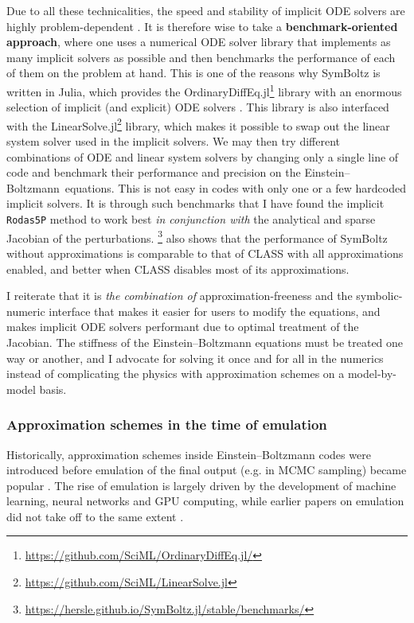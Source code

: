 \documentclass[USenglish, thumbmarks]{uiophdthesis} %
\newcommand\EB{Einstein--Boltzmann}
\begin{document}
Due to all these technicalities,
the speed and stability of implicit ODE solvers are highly problem-dependent
\cite[e.g.][section IV.10]{hairerSolvingOrdinaryDifferential1996}.
It is therefore wise to take a \textbf{benchmark-oriented approach},
where one uses a numerical ODE solver library that implements as many implicit solvers as possible
and then benchmarks the performance of each of them on the problem at hand.
This is one of the reasons why SymBoltz is written in Julia,
which provides the OrdinaryDiffEq.jl\footnote{\url{https://github.com/SciML/OrdinaryDiffEq.jl/}} library
with an enormous selection of implicit (and explicit) ODE solvers
\cite{rackauckasDifferentialEquationsjlPerformantFeatureRich2017a}.
This library is also interfaced with the LinearSolve.jl\footnote{\url{https://github.com/SciML/LinearSolve.jl}} library,
which makes it possible to swap out the linear system solver used in the implicit solvers.
We may then try different combinations of ODE and linear system solvers
by changing only a single line of code and benchmark their performance and precision on the \EB{} equations.
This is not easy in codes with only one or a few hardcoded implicit solvers.
It is through such benchmarks that I have found the implicit \texttt{Rodas5P} method to work best
\emph{in conjunction with} the analytical and sparse Jacobian of the perturbations.%
\footnote{\url{https://hersle.github.io/SymBoltz.jl/stable/benchmarks/}}
also shows that the performance of SymBoltz without approximations is comparable to that of CLASS with all approximations enabled,
and better when CLASS disables most of its approximations.

I reiterate that it is \emph{the combination of} approximation-freeness and the symbolic-numeric interface
that makes it easier for users to modify the equations,
and makes implicit ODE solvers performant due to optimal treatment of the Jacobian.
The stiffness of the \EB{} equations must be treated one way or another,
and I advocate for solving it once and for all in the numerics
instead of complicating the physics with approximation schemes on a model-by-model basis.

\subsubsection{Approximation schemes in the time of emulation}

Historically, approximation schemes inside \EB{} codes
\cite[e.g.][]{maCosmologicalPerturbationTheory1995a,blasCosmicLinearAnisotropy2011c}
were introduced before emulation of the final output (e.g. in MCMC sampling) became popular
\cite[e.g.][]{manciniCOSMOPOWEREmulatingCosmological2022b,pirasCosmoPowerJAXHighdimensionalBayesian2023}.
The rise of emulation is largely driven by the development of machine learning, neural networks and GPU computing,
while earlier papers on emulation did not take off to the same extent
\cite[e.g.][]{fendtPicoParametersImpatient2007,fendtComputingHighAccuracy2007,auldFastCosmologicalParameter2007,auldScCosmoNetFast2008}.
\end{document}
